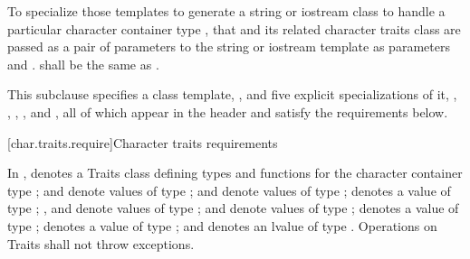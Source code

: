 \pnum
To specialize those templates to generate a string or
iostream class to handle a particular character container type
,
that and its related character traits class
are passed as a pair of parameters to the string or iostream template as
parameters
and
.
shall be the same as
.

\pnum
This subclause specifies a class template,
,
and five explicit specializations of it,
,
,
,
,
and
,
all of which appear in the header
and satisfy the requirements below.

[char.traits.require]{Character traits requirements}

\pnum
In ,
denotes a Traits class defining types and functions for the
character container type
;
and
denote values of type
;
and
denote values of type
;
denotes a value of type
;
,
and
denote values of type
;
and
denote values of type
;
denotes a value of type
;
denotes a value of type
;
and
denotes an lvalue of type
.
Operations on Traits shall not throw exceptions.

